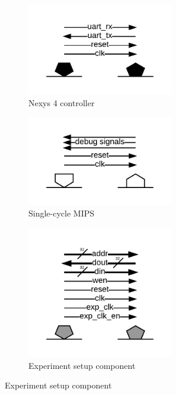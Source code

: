 \documentclass{article}
\begin{document}
\begin{figure}
    \centering%
    \caption{Interface defintions for those displayed in figures \ref{fig:mips-original} and \ref{fig:mips-wrapped}.}
    \label{fig:interfaces}
    \begin{subfigure}[b]{0.33\linewidth}
        \centering\captionsetup{width=0.95\linewidth}%
        \includegraphics[width=0.70\textwidth,trim=70px 70px 70px 70px, clip=true]{img/interface-nexys4}%
        \caption{Nexys 4 controller}
    \end{subfigure}%
    \begin{subfigure}[b]{0.33\linewidth}
        \centering\captionsetup{width=0.95\linewidth}%
        \includegraphics[width=0.70\textwidth,trim=70px 70px 70px 70px, clip=true]{img/interface-mips}%
        \caption{Single-cycle MIPS}
    \end{subfigure}%
    \begin{subfigure}[b]{0.33\linewidth}
        \centering\captionsetup{width=0.95\linewidth}%
        \includegraphics[width=0.70\textwidth,trim=70px 70px 70px 70px, clip=true]{img/interface-experiment-setup-component}%
        \caption{Experiment setup component}
        \label{fig:interface-experiment-setup-component}
    \end{subfigure}
    

\end{figure}
\end{document}
